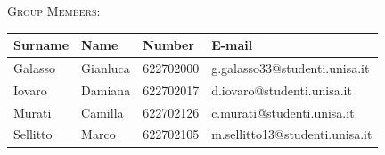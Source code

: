 \begin{titlepage}
    \textsc{Group Members:}\\
    \begin{table}[h!]
        \centering
        \begin{tabular}{| m{3cm} | m{3cm} | m{3cm} | m{6cm} |}
        \hline
        \textbf{Surname} & \textbf{Name} & \textbf{Number} & \textbf{E-mail} \\ 
        \hline
        Galasso & Gianluca & 622702000 & g.galasso33@studenti.unisa.it \\ 
        \hline
        Iovaro & Damiana & 622702017 & d.iovaro@studenti.unisa.it \\ 
        \hline
        Murati & Camilla & 622702126 & c.murati@studenti.unisa.it \\ 
        \hline
        Sellitto & Marco & 622702105 & m.sellitto13@studenti.unisa.it \\ 
        \hline
        \end{tabular}
        \label{table:1}
    \end{table}

\end{titlepage}
